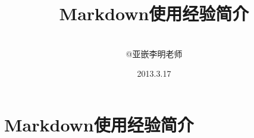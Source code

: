 \documentclass[11pt, a4paper]{book}
\begin{document}
\title{Markdown使用经验简介}
\author{\\@亚嵌李明老师}
\date{2013.3.17}
\maketitle
\tableofcontents\newpage

\chapter{Markdown使用经验简介}

\end{document}
